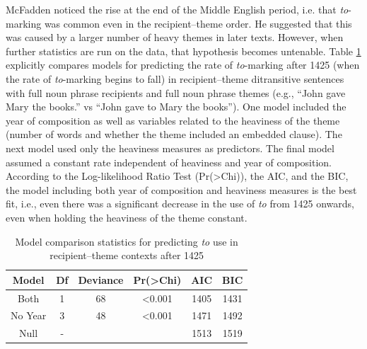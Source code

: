 McFadden noticed the rise at the end of the Middle English period, i.e. that \textit{to}-marking was common even in the recipient--theme order. He suggested that this was caused by a larger number of heavy themes in later texts. However, when further statistics are run on the data, that hypothesis becomes untenable. Table \ref{tab:model-comp} explicitly compares models for predicting the rate of \textit{to}-marking after 1425 (when the rate of \textit{to}-marking begins to fall) in recipient--theme ditransitive sentences with full noun phrase recipients and full noun phrase themes (e.g., ``John gave Mary the books.'' vs ``John gave to Mary the books''). One model included the year of composition as well as variables related to the heaviness of the theme (number of words and whether the theme included an embedded clause). The next model used only the heaviness measures as predictors. The final model assumed a constant rate independent of heaviness and year of composition. According to the Log-likelihood Ratio Test (Pr(>Chi)), the AIC, and the BIC, the model including both year of composition and heaviness measures is the best fit, i.e., even there was a significant decrease in the use of \textit{to} from 1425 onwards, even when holding the heaviness of the theme constant.

\begin{table}[ht!]
	\begin{tabular}{cccccc}
	\hline
	Model	& Df & Deviance & Pr(>Chi) & AIC & BIC\\
	\hline
	Both	& 1  & 68       & <0.001   & 1405 & 1431\\
	No Year & 3  & 48       & <0.001   & 1471 & 1492\\
	Null    & -  &          &          & 1513 & 1519\\
	\hline
	\end{tabular}
	\caption{Model comparison statistics for predicting \textit{to} use in recipient--theme contexts after 1425}
	\label{tab:model-comp}
\end{table}

